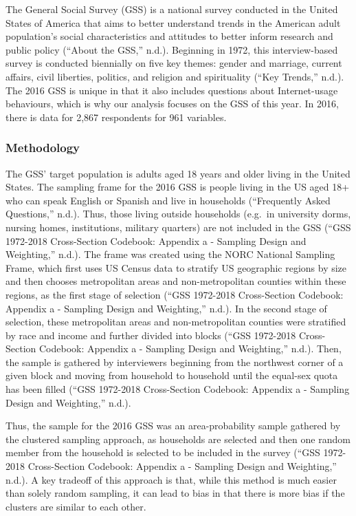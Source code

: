 \documentclass[
]{article}
\begin{document}
The General Social Survey (GSS) is a national survey conducted in the
United States of America that aims to better understand trends in the
American adult population's social characteristics and attitudes to
better inform research and public policy ({``About the GSS,''} n.d.).
Beginning in 1972, this interview-based survey is conducted biennially
on five key themes: gender and marriage, current affairs, civil
liberties, politics, and religion and spirituality ({``Key Trends,''}
n.d.). The 2016 GSS is unique in that it also includes questions about
Internet-usage behaviours, which is why our analysis focuses on the GSS
of this year. In 2016, there is data for 2,867 respondents for 961
variables.

\hypertarget{methodology}{%
\subsubsection{Methodology}\label{methodology}}

The GSS' target population is adults aged 18 years and older living in
the United States. The sampling frame for the 2016 GSS is people living
in the US aged 18+ who can speak English or Spanish and live in
households ({``Frequently Asked Questions,''} n.d.). Thus, those living
outside households (e.g.~in university dorms, nursing homes,
institutions, military quarters) are not included in the GSS ({``GSS
1972-2018 Cross-Section Codebook: Appendix a - Sampling Design and
Weighting,''} n.d.). The frame was created using the NORC National
Sampling Frame, which first uses US Census data to stratify US
geographic regions by size and then chooses metropolitan areas and
non-metropolitan counties within these regions, as the first stage of
selection ({``GSS 1972-2018 Cross-Section Codebook: Appendix a -
Sampling Design and Weighting,''} n.d.). In the second stage of
selection, these metropolitan areas and non-metropolitan counties were
stratified by race and income and further divided into blocks ({``GSS
1972-2018 Cross-Section Codebook: Appendix a - Sampling Design and
Weighting,''} n.d.). Then, the sample is gathered by interviewers
beginning from the northwest corner of a given block and moving from
household to household until the equal-sex quota has been filled ({``GSS
1972-2018 Cross-Section Codebook: Appendix a - Sampling Design and
Weighting,''} n.d.).

Thus, the sample for the 2016 GSS was an area-probability sample
gathered by the clustered sampling approach, as households are selected
and then one random member from the household is selected to be included
in the survey ({``GSS 1972-2018 Cross-Section Codebook: Appendix a -
Sampling Design and Weighting,''} n.d.). A key tradeoff of this approach
is that, while this method is much easier than solely random sampling,
it can lead to bias in that there is more bias if the clusters are
similar to each other.
\end{document}
